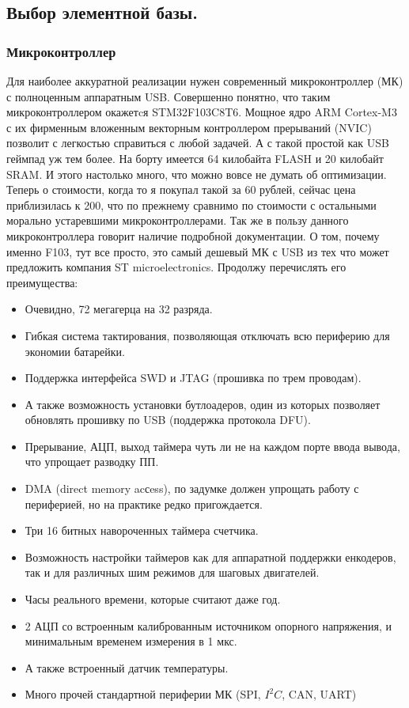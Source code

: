 \documentclass[12pt,a4paper]{article}
\begin{document}
\subsection{Выбор элементной базы.}
\subsubsection{Микроконтроллер}
    Для наиболее аккуратной реализации нужен современный микроконтроллер (МК) с
    полноценным аппаратным USB. Совершенно понятно, что таким микроконтроллером
    окажетcя STM32F103C8T6. Мощное ядро ARM Cortex-M3 с их фирменным вложенным
    векторным контроллером прерываний (NVIC) позволит с легкостью справиться с любой
    задачей. А с такой простой как USB геймпад уж тем более. На борту имеется
    64 килобайта FLASH и 20 килобайт SRAM. И этого настолько много, что можно
    вовсе не думать об оптимизации. Теперь о стоимости, когда то я покупал такой
    за 60 рублей, сейчас цена приблизилась к 200, что по прежнему сравнимо по
    стоимости с остальными морально устаревшими микроконтроллерами. Так же в
    пользу данного микроконтроллера говорит наличие подробной
    документации. О том, почему именно F103, тут все просто, это самый дешевый
    МК с USB из тех что может предложить компания ST microelectronics. Продолжу
    перечислять его преимущества:
\begin{itemize}
    \item Очевидно, 72 мегагерца на 32 разряда.
    \item Гибкая система тактирования, позволяющая отключать всю периферию
    для экономии батарейки.
    \item Поддержка интерфейса SWD и JTAG (прошивка по трем проводам).
    \item А также возможность установки бутлоадеров, один из которых позволяет
    обновлять прошивку по USB (поддержка протокола DFU).
    \item Прерывание, АЦП, выход таймера чуть ли не на каждом порте ввода вывода,
     что упрощает разводку ПП.
    \item DMA (direct memory acсess), по задумке должен упрощать работу с
    периферией, но на практике редко пригождается.
    \item Три 16 битных навороченных таймера счетчика.
    \item Возможность настройки таймеров как для аппаратной поддержки енкодеров,
    так и для различных шим режимов для шаговых двигателей.
    \item Часы реального времени, которые считают даже год.
    \item 2 АЦП со встроенным калиброванным источником опорного напряжения,
    и минимальным временем измерения в 1 мкс.
    \item А также встроенный датчик температуры.
    \item Много прочей стандартной периферии МК (SPI, $I^2C$, CAN, UART)
\end{itemize}
\end{document}
